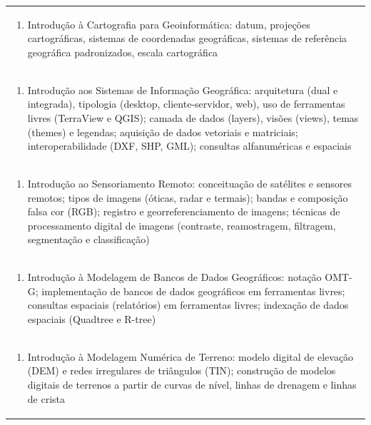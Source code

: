 \documentclass[11pt]{article}
\begin{document}
\begin{center}
\begin{longtable}{|p{4cm}|p{4cm}|p{4cm}|p{4cm}|}
\multicolumn{4}{|p{\dimexpr 16cm + 6\tabcolsep\relax}|}{\begin{enumerate}[start=2]\item Introdução à Cartografia para Geoinformática: datum, projeções cartográficas, sistemas de coordenadas geográficas, sistemas de referência geográfica padronizados, escala cartográfica\end{enumerate}}\\
\multicolumn{4}{|p{\dimexpr 16cm + 6\tabcolsep\relax}|}{\begin{enumerate}[start=3]\item Introdução aos Sistemas de Informação Geográfica: arquitetura (dual e integrada), tipologia (desktop, cliente-servidor, web), uso de ferramentas livres (TerraView e QGIS); camada de dados (layers), visões (views), temas (themes) e legendas; aquisição de dados vetoriais e matriciais; interoperabilidade (DXF, SHP, GML); consultas alfanuméricas e espaciais\end{enumerate}}\\
\multicolumn{4}{|p{\dimexpr 16cm + 6\tabcolsep\relax}|}{\begin{enumerate}[start=4]\item Introdução ao Sensoriamento Remoto: conceituação de satélites e sensores remotos; tipos de imagens (óticas, radar e termais); bandas e composição falsa cor (RGB); registro e georreferenciamento de imagens; técnicas de processamento digital de imagens (contraste, reamostragem, filtragem, segmentação e classificação)\end{enumerate}}\\
\multicolumn{4}{|p{\dimexpr 16cm + 6\tabcolsep\relax}|}{\begin{enumerate}[start=5]\item Introdução à Modelagem de Bancos de Dados Geográficos: notação OMT-G; implementação de bancos de dados geográficos em ferramentas livres; consultas espaciais (relatórios) em ferramentas livres; indexação de dados espaciais (Quadtree e R-tree)\end{enumerate}}\\
\multicolumn{4}{|p{\dimexpr 16cm + 6\tabcolsep\relax}|}{\begin{enumerate}[start=6]\item Introdução à Modelagem Numérica de Terreno: modelo digital de elevação (DEM) e redes irregulares de triângulos (TIN); construção de modelos digitais de terrenos a partir de curvas de nível, linhas de drenagem e linhas de crista\end{enumerate}}\\

\end{longtable}
\end{center}
\end{document}
